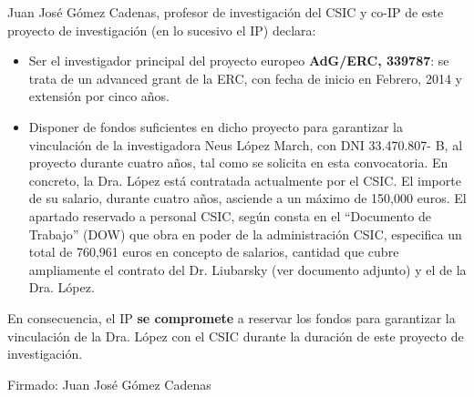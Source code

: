 \documentclass[a4paper,11pt,oneside]{article}
\begin{document}


%

Juan José Gómez Cadenas, profesor de investigación del CSIC y co-IP de este proyecto de investigación (en lo sucesivo el IP) declara: 

\begin{itemize}

\item Ser el investigador principal del proyecto europeo {\bf AdG/ERC, 339787}: se trata de un advanced grant de la ERC, con fecha de inicio en Febrero, 2014 y extensión por cinco años.  
% 
\item Disponer de fondos suficientes en dicho proyecto para garantizar la vinculación de la investigadora Neus López March, con DNI 33.470.807- B, al proyecto durante cuatro años, tal como se solicita en esta convocatoria.  En concreto, la Dra. López está contratada actualmente por el CSIC. El importe de su salario, durante cuatro años, asciende a un máximo de 150,000 euros. El apartado reservado a personal CSIC, según consta en el ``Documento de Trabajo'' (DOW) que obra en poder de la administración CSIC, especifica un total de 760,961 euros en concepto de salarios, cantidad que cubre ampliamente el contrato del Dr. Liubarsky (ver documento adjunto) y el de la Dra. López.
\end{itemize}
%

En consecuencia, el IP {\bf se compromete} a reservar los fondos para garantizar la   vinculación de la Dra. López con el CSIC durante la duración de este proyecto de investigación. 


Firmado: Juan José Gómez Cadenas
\end{document}
